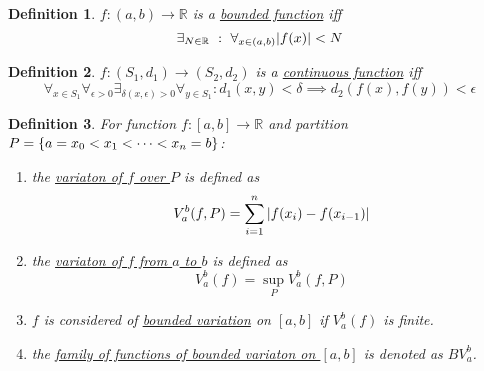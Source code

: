 \documentclass[]{article}
\newcommand{\R}{\mathbb{R}}
\newcommand{\st}{\ : \ }
\newtheorem{definition}{Definition}
\begin{document}
\begin{definition} \label{def:bounded_fun}
    $f : (a,b) \to \R$ is a \emph{\underline{bounded function}} iff \[
        \exists_{N \in \R} \st \forall_{x \in (a,b)} \abs{f(x)} < N
    \]
\end{definition}

\begin{definition} \label{def:cont_fun}
    $f: (S_1, d_1) \to (S_2, d_2)$ is a \underline{\emph{continuous function}} iff \[
        \forall_{x\in S_1} \forall_{\epsilon>0} \exists_{\delta(x,\epsilon)>0} \forall_{y\in S_1} : d_1(x,y) < \delta \implies d_2(f(x),f(y)) < \epsilon
    \]
\end{definition} 

\begin{definition} \label{def:partition_variation}
For function $f: [a,b] \to \R$ and partition $P = \qty{a = x_0 < x_1 < \cdots < x_n = b}$:
    \begin{enumerate}
        \item the \emph{\underline{variaton of $f$ over $P$}} is defined as\[
            V_{a}^{b}(f,P) = \sum_{i=1}^{n} \abs{f(x_i) - f(x_{i-1})}
        \]
        \item the \emph{\underline{variaton of $f$ from $a$ to $b$}} is defined as\[
            V_{a}^{b}(f) = \sup_{P} V_{a}^{b}(f,P)
        \]
        \item $f$ is considered of \emph{\underline{bounded variation}} on $[a,b]$ if $V_{a}^{b}(f)$ is finite.
        \item the \emph{\underline{family of functions of bounded variaton on $[a,b]$}} is denoted as $BV_{a}^{b}$.
    \end{enumerate}
\end{definition}
\end{document}
